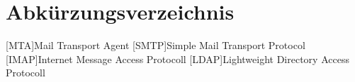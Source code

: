 
\chapter*{Abkürzungsverzeichnis}
\markboth{}{}

\begin{acronym}[EuGH]
[MTA]{Mail Transport Agent}
[SMTP]{Simple Mail Transport Protocol}
[IMAP]{Internet Message Access Protocoll}
[LDAP]{Lightweight Directory Access Protocoll}

\end{acronym}